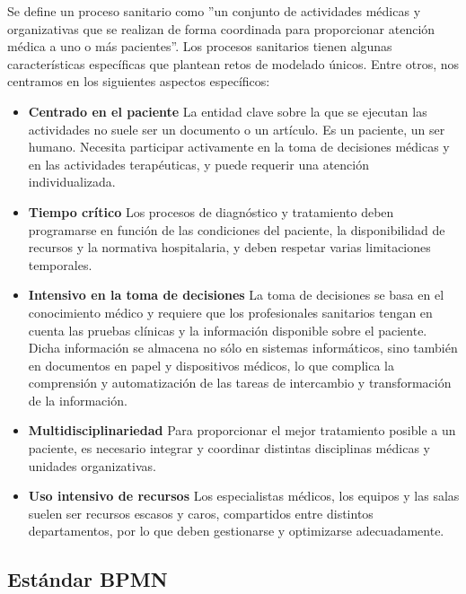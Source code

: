Se define un proceso sanitario como ''un conjunto de actividades médicas y organizativas que se realizan de forma coordinada para proporcionar atención médica a uno o más pacientes''. Los procesos sanitarios tienen algunas características específicas que plantean retos de modelado únicos. Entre otros, nos centramos en los siguientes aspectos específicos:

\begin{itemize}
    \item \textbf{Centrado en el paciente} La entidad clave sobre la que se ejecutan las actividades no suele ser un documento o un artículo. Es un paciente, un ser humano. Necesita participar activamente en la toma de decisiones médicas y en las actividades terapéuticas, y puede requerir una atención individualizada.
    \item \textbf{Tiempo crítico} Los procesos de diagnóstico y tratamiento deben programarse en función de las condiciones del paciente, la disponibilidad de recursos y la normativa hospitalaria, y deben respetar varias limitaciones temporales.
    \item \textbf{Intensivo en la toma de decisiones} La toma de decisiones se basa en el conocimiento médico y requiere que los profesionales sanitarios tengan en cuenta las pruebas clínicas y la información disponible sobre el paciente. Dicha información se almacena no sólo en sistemas informáticos, sino también en documentos en papel y dispositivos médicos, lo que complica la comprensión y automatización de las tareas de intercambio y transformación de la información.
    \item \textbf{Multidisciplinariedad} Para proporcionar el mejor tratamiento posible a un paciente, es necesario integrar y coordinar distintas disciplinas médicas y unidades organizativas.
    \item \textbf{Uso intensivo de recursos} Los especialistas médicos, los equipos y las salas suelen ser recursos escasos y caros, compartidos entre distintos departamentos, por lo que deben gestionarse y optimizarse adecuadamente.
\end{itemize}

\subsection{Estándar BPMN}

